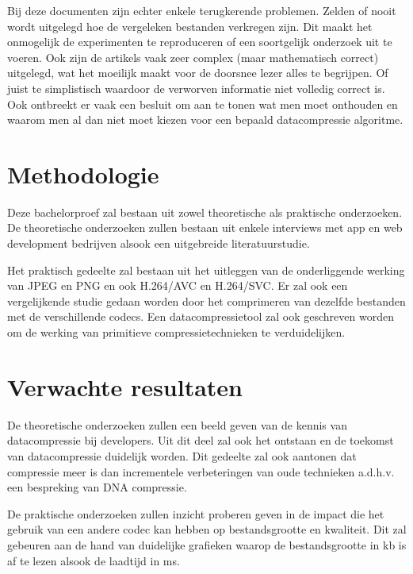 Bij deze documenten zijn echter enkele terugkerende problemen. Zelden of nooit wordt uitgelegd hoe de vergeleken bestanden verkregen zijn. Dit maakt het onmogelijk de experimenten te reproduceren of een soortgelijk onderzoek uit te voeren. Ook zijn de artikels vaak zeer complex (maar mathematisch correct) uitgelegd, wat het moeilijk maakt voor de doorsnee lezer alles te begrijpen. Of juist te simplistisch waardoor de verworven informatie niet volledig correct is. Ook ontbreekt er vaak een besluit om aan te tonen wat men moet onthouden en waarom men al dan niet moet kiezen voor een bepaald datacompressie algoritme. 

\section{Methodologie}
\label{sec:methodologie}

Deze bachelorproef zal bestaan uit zowel theoretische als praktische onderzoeken. De theoretische onderzoeken zullen bestaan uit enkele interviews met app en web development bedrijven alsook een uitgebreide literatuurstudie.

Het praktisch gedeelte zal bestaan uit het uitleggen van de onderliggende werking van JPEG en PNG en ook H.264/AVC en H.264/SVC. Er zal ook een vergelijkende studie gedaan worden door het comprimeren van dezelfde bestanden met de verschillende codecs. Een datacompressietool zal ook geschreven worden om de werking van primitieve compressietechnieken te verduidelijken.

\section{Verwachte resultaten}
\label{sec:verwachte_resultaten}

De theoretische onderzoeken zullen een beeld geven van de kennis van datacompressie bij developers. Uit dit deel zal ook het ontstaan en de toekomst van datacompressie duidelijk worden. Dit gedeelte zal ook aantonen dat compressie meer is dan incrementele verbeteringen van oude technieken a.d.h.v. een bespreking van DNA compressie.

De praktische onderzoeken zullen inzicht proberen geven in de impact die het gebruik van een andere codec kan hebben op bestandsgrootte en kwaliteit. Dit zal gebeuren aan de hand van duidelijke grafieken waarop de bestandsgrootte in kb is af te lezen alsook de laadtijd in ms.

